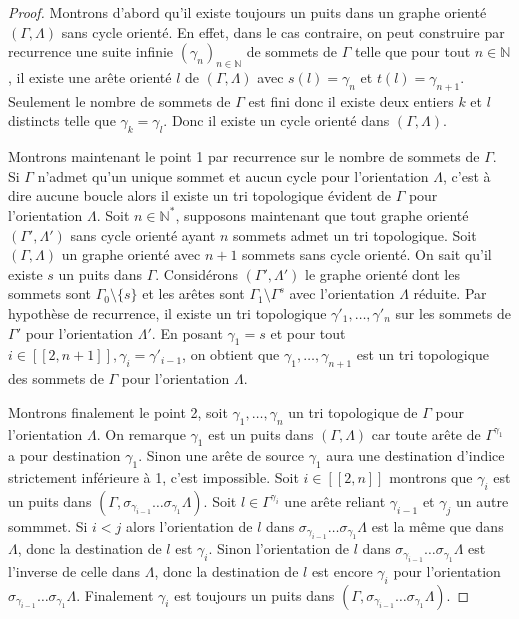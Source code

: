 \documentclass[a4paper,11pt]{article}
\begin{document}
\begin{proof}
  Montrons d'abord qu'il existe toujours un puits dans un graphe orienté $(\Gamma,\Lambda)$ sans cycle orienté. En effet, dans le cas contraire, on peut construire par recurrence une suite infinie $(\gamma_{n})_{n\in \mathbb N}$ de sommets de $\Gamma$ telle que pour tout $n \in \mathbb N$, il existe une arête orienté $l$ de $(\Gamma,\Lambda)$ avec $s(l) = \gamma_{n}$ et $t(l) = \gamma_{n+1}$. Seulement le nombre de sommets de $\Gamma$ est fini donc il existe deux entiers $k$ et $l$ distincts telle que $\gamma_{k} = \gamma_{l}$. Donc il existe un cycle orienté dans $(\Gamma, \Lambda)$.

Montrons maintenant le point 1 par recurrence sur le nombre de sommets de $\Gamma$. Si $\Gamma$ n'admet qu'un unique sommet et aucun cycle pour l'orientation $\Lambda$, c'est à dire aucune boucle alors il existe un tri topologique évident de $\Gamma$ pour l'orientation $\Lambda$. Soit $n \in \mathbb N^{*}$, supposons maintenant que tout graphe orienté $(\Gamma',\Lambda')$ sans cycle orienté ayant $n$ sommets admet un tri topologique. Soit $(\Gamma,\Lambda)$ un graphe orienté avec $n+1$ sommets sans cycle orienté. On sait qu'il existe $s$ un puits dans $\Gamma$. Considérons $(\Gamma',\Lambda')$ le graphe orienté dont les sommets sont $\Gamma_{0} \setminus \{s\}$ et les arêtes sont $\Gamma_{1} \setminus \Gamma^{s}$ avec l'orientation $\Lambda$ réduite. Par hypothèse de recurrence, il existe un tri topologique $\gamma'_{1}, \dots, \gamma'_{n}$ sur les sommets de $\Gamma'$ pour l'orientation $\Lambda'$. En posant $\gamma_{1} = s$ et pour tout $i \in [\![2,n+1]\!], \gamma_{i} = \gamma'_{i-1}$, on obtient que $\gamma_{1}, \dots, \gamma_{n+1}$ est un tri topologique des sommets de $\Gamma$ pour l'orientation $\Lambda$. 

Montrons finalement le point 2, soit $\gamma_{1}, \dots, \gamma_{n}$ un tri topologique de $\Gamma$ pour l'orientation $\Lambda$. On remarque $\gamma_{1}$ est un puits dans $(\Gamma,\Lambda)$ car toute arête de $\Gamma^{\gamma_{1}}$ a pour destination $\gamma_{1}$. Sinon une arête de source $\gamma_{1}$ aura une destination d'indice strictement inférieure à 1, c'est impossible. Soit $i \in [\![2,n]\!]$ montrons que $\gamma_{i}$ est un puits dans $(\Gamma,\sigma_{\gamma_{i-1}} \dots \sigma_{\gamma_{1}} \Lambda)$. Soit $l \in \Gamma^{\gamma_{i}}$ une arête reliant $\gamma_{i-1}$ et $\gamma_{j}$ un autre sommmet. Si $i<j$ alors l'orientation de $l$ dans $\sigma_{\gamma_{i-1}} \dots \sigma_{\gamma_{1}} \Lambda$ est la même que dans $\Lambda$, donc la destination de $l$ est $\gamma_{i}$. Sinon l'orientation de $l$ dans $\sigma_{\gamma_{i-1}} \dots \sigma_{\gamma_{1}} \Lambda$ est l'inverse de celle dans $\Lambda$, donc la destination de $l$ est encore $\gamma_{i}$ pour l'orientation $\sigma_{\gamma_{i-1}} \dots \sigma_{\gamma_{1}} \Lambda$. Finalement $\gamma_{i}$ est toujours un puits dans $(\Gamma,\sigma_{\gamma_{i-1}} \dots \sigma_{\gamma_{1}} \Lambda)$.
\end{proof}
\end{document}
